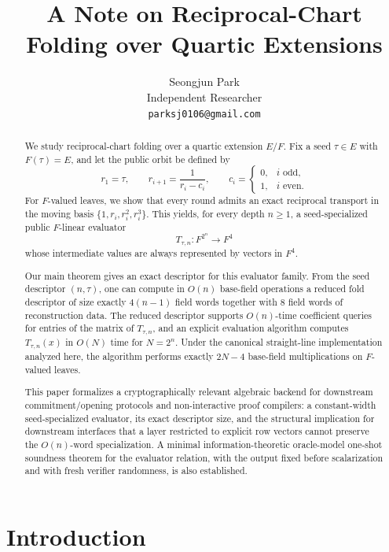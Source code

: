 \documentclass[11pt]{article}
\title{A Note on Reciprocal-Chart Folding over Quartic Extensions}
\author{Seongjun Park\\Independent Researcher\\\texttt{parksj0106@gmail.com}}
\date{}
\begin{document}
\maketitle

\begin{abstract}
We study reciprocal-chart folding over a quartic extension \(E/F\). Fix a seed \(\tau\in E\) with \(F(\tau)=E\), and let the public orbit be defined by
\[
r_1=\tau,
\qquad
r_{i+1}=\frac{1}{r_i-c_i},
\qquad
c_i=
\begin{cases}
0,& i\text{ odd},\\
1,& i\text{ even}.
\end{cases}
\]
For \(F\)-valued leaves, we show that every round admits an exact reciprocal transport in the moving basis \(\{1,r_i,r_i^2,r_i^3\}\). This yields, for every depth \(n\ge 1\), a seed-specialized public \(F\)-linear evaluator
\[
T_{\tau,n}:F^{2^n}\to F^4
\]
whose intermediate values are always represented by vectors in \(F^4\).

Our main theorem gives an exact descriptor for this evaluator family. From the seed descriptor \((n,\tau)\), one can compute in \(O(n)\) base-field operations a reduced fold descriptor of size exactly \(4(n-1)\) field words together with \(8\) field words of reconstruction data. The reduced descriptor supports \(O(n)\)-time coefficient queries for entries of the matrix of \(T_{\tau,n}\), and an explicit evaluation algorithm computes \(T_{\tau,n}(x)\) in \(O(N)\) time for \(N=2^n\). Under the canonical straight-line implementation analyzed here, the algorithm performs exactly \(2N-4\) base-field multiplications on \(F\)-valued leaves.

This paper formalizes a cryptographically relevant algebraic backend for downstream commitment/opening protocols and non-interactive proof compilers: a constant-width seed-specialized evaluator, its exact descriptor size, and the structural implication for downstream interfaces that a layer restricted to explicit row vectors cannot preserve the \(O(n)\)-word specialization. A minimal information-theoretic oracle-model one-shot soundness theorem for the evaluator relation, with the output fixed before scalarization and with fresh verifier randomness, is also established.
\end{abstract}

\section{Introduction}
\end{document}
